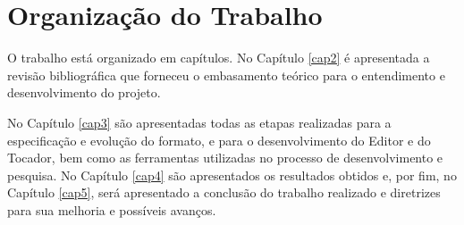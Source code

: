 \section{Organização do Trabalho}

O trabalho está organizado em capítulos. No Capítulo \ref{cap2} é apresentada a revisão bibliográfica que forneceu o embasamento teórico para o entendimento e desenvolvimento do projeto.

No Capítulo \ref{cap3} são apresentadas todas as etapas realizadas para a especificação e evolução do formato, e para o desenvolvimento do Editor e do Tocador, bem como as ferramentas utilizadas no processo de desenvolvimento e pesquisa.  No Capítulo \ref{cap4} são apresentados os resultados obtidos e, por fim, no Capítulo \ref{cap5}, será apresentado a conclusão do trabalho realizado e diretrizes para sua melhoria e possíveis avanços.